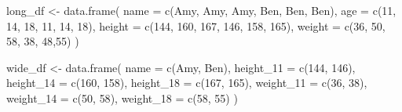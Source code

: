 \documentclass[
  letterpaper,
  DIV=11,
  numbers=noendperiod]{scrreprt}
\newenvironment{Shaded}{\begin{snugshade}}{\end{snugshade}}
\newcommand{\AttributeTok}[1]{\textcolor[rgb]{0.40,0.45,0.13}{#1}}
\newcommand{\DecValTok}[1]{\textcolor[rgb]{0.68,0.00,0.00}{#1}}
\newcommand{\FunctionTok}[1]{\textcolor[rgb]{0.28,0.35,0.67}{#1}}
\newcommand{\NormalTok}[1]{\textcolor[rgb]{0.00,0.23,0.31}{#1}}
\newcommand{\OtherTok}[1]{\textcolor[rgb]{0.00,0.23,0.31}{#1}}
\newcommand{\StringTok}[1]{\textcolor[rgb]{0.13,0.47,0.30}{#1}}
\begin{document}
\begin{Shaded}
\begin{Highlighting}[]
\NormalTok{long\_df }\OtherTok{\textless{}{-}} \FunctionTok{data.frame}\NormalTok{(}
  \AttributeTok{name   =} \FunctionTok{c}\NormalTok{(}\StringTok{\textquotesingle{}Amy\textquotesingle{}}\NormalTok{, }\StringTok{\textquotesingle{}Amy\textquotesingle{}}\NormalTok{, }\StringTok{\textquotesingle{}Amy\textquotesingle{}}\NormalTok{, }\StringTok{\textquotesingle{}Ben\textquotesingle{}}\NormalTok{, }\StringTok{\textquotesingle{}Ben\textquotesingle{}}\NormalTok{, }\StringTok{\textquotesingle{}Ben\textquotesingle{}}\NormalTok{),}
  \AttributeTok{age    =} \FunctionTok{c}\NormalTok{(}\DecValTok{11}\NormalTok{, }\DecValTok{14}\NormalTok{, }\DecValTok{18}\NormalTok{, }\DecValTok{11}\NormalTok{, }\DecValTok{14}\NormalTok{, }\DecValTok{18}\NormalTok{),}
  \AttributeTok{height =} \FunctionTok{c}\NormalTok{(}\DecValTok{144}\NormalTok{, }\DecValTok{160}\NormalTok{, }\DecValTok{167}\NormalTok{, }\DecValTok{146}\NormalTok{, }\DecValTok{158}\NormalTok{, }\DecValTok{165}\NormalTok{),}
  \AttributeTok{weight =} \FunctionTok{c}\NormalTok{(}\DecValTok{36}\NormalTok{, }\DecValTok{50}\NormalTok{, }\DecValTok{58}\NormalTok{, }\DecValTok{38}\NormalTok{, }\DecValTok{48}\NormalTok{,}\DecValTok{55}\NormalTok{)}
\NormalTok{)}

\NormalTok{wide\_df }\OtherTok{\textless{}{-}} \FunctionTok{data.frame}\NormalTok{(}
  \AttributeTok{name   =} \FunctionTok{c}\NormalTok{(}\StringTok{\textquotesingle{}Amy\textquotesingle{}}\NormalTok{, }\StringTok{\textquotesingle{}Ben\textquotesingle{}}\NormalTok{),}
  \AttributeTok{height\_11 =} \FunctionTok{c}\NormalTok{(}\DecValTok{144}\NormalTok{, }\DecValTok{146}\NormalTok{),}
  \AttributeTok{height\_14 =} \FunctionTok{c}\NormalTok{(}\DecValTok{160}\NormalTok{, }\DecValTok{158}\NormalTok{),}
  \AttributeTok{height\_18 =} \FunctionTok{c}\NormalTok{(}\DecValTok{167}\NormalTok{, }\DecValTok{165}\NormalTok{),}
  \AttributeTok{weight\_11 =} \FunctionTok{c}\NormalTok{(}\DecValTok{36}\NormalTok{, }\DecValTok{38}\NormalTok{),}
  \AttributeTok{weight\_14 =} \FunctionTok{c}\NormalTok{(}\DecValTok{50}\NormalTok{, }\DecValTok{58}\NormalTok{),}
  \AttributeTok{weight\_18 =} \FunctionTok{c}\NormalTok{(}\DecValTok{58}\NormalTok{, }\DecValTok{55}\NormalTok{)}
\NormalTok{)}
\end{Highlighting}
\end{Shaded}
\end{document}
